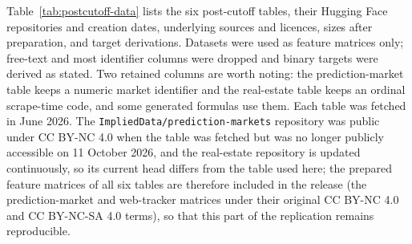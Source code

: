 Table~\ref{tab:postcutoff-data} lists the six post-cutoff tables, their Hugging Face repositories and creation dates, underlying sources and licences, sizes after preparation, and target derivations. Datasets were used as feature matrices only; free-text and most identifier columns were dropped and binary targets were derived as stated. Two retained columns are worth noting: the prediction-market table keeps a numeric market identifier and the real-estate table keeps an ordinal scrape-time code, and some generated formulas use them. Each table was fetched in June 2026. The \texttt{ImpliedData/prediction-markets} repository was public under CC BY-NC 4.0 when the table was fetched but was no longer publicly accessible on 11 October 2026, and the real-estate repository is updated continuously, so its current head differs from the table used here; the prepared feature matrices of all six tables are therefore included in the release (the prediction-market and web-tracker matrices under their original CC BY-NC 4.0 and CC BY-NC-SA 4.0 terms), so that this part of the replication remains reproducible.


